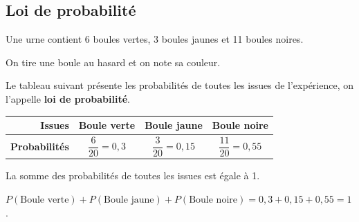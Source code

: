 \subsection{Loi de probabilité}

\begin{exemple}
	Une urne contient 6 boules vertes, 3 boules jaunes et 11 boules noires.

	On tire une boule au hasard et on note sa couleur.

	Le tableau suivant présente les probabilités de toutes les issues de l'expérience, on l'appelle \textbf{loi de probabilité}.
	\begin{center}
		\def\arraystretch{1.5}
		\begin{tabular}{|r|c|c|c|} \hline
			\textbf{Issues}                              & Boule verte           & Boule jaune            & Boule noire             \\ \hline
			\rule[-12pt]{0pt}{32pt}\textbf{Probabilités} & $\dfrac{6}{20} = 0,3$ & $\dfrac{3}{20} = 0,15$ & $\dfrac{11}{20} = 0,55$ \\ \hline
		\end{tabular}
	\end{center}
\end{exemple}

\begin{propriete}
	La somme des probabilités de toutes les issues est égale à 1.
\end{propriete}

\begin{exemple}
	$P(\text{Boule verte}) + P(\text{Boule jaune}) + P(\text{Boule noire}) = 0,3 + 0,15 + 0,55 = 1$.
\end{exemple}

